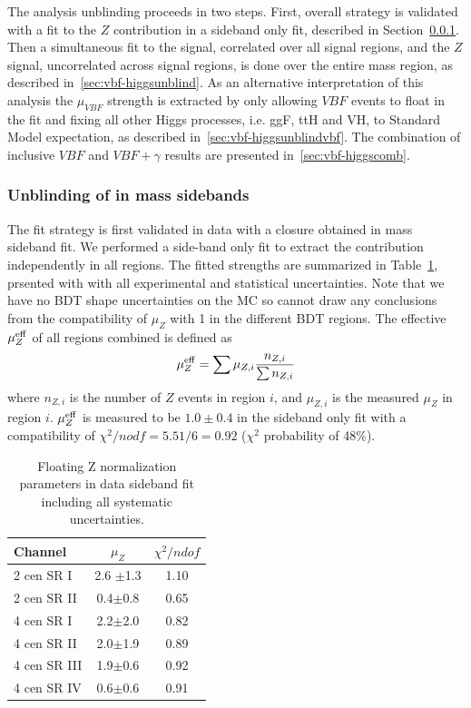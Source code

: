 The analysis unblinding proceeds in two steps.  First, overall strategy is validated with a fit to the $Z$ contribution in a sideband only fit, described in Section~\ref{sec:vbf-zunblind}.  Then a simultaneous fit to the signal, correlated over all signal regions, and the $Z$ signal, uncorrelated across signal regions, is done over the entire mass region, as described in~\ref{sec:vbf-higgsunblind}. As an alternative interpretation of this analysis the $\mu_{VBF}$ strength is extracted by only allowing $VBF$ events to float in the fit and fixing all other Higgs processes, i.e. ggF, ttH and VH, to Standard Model expectation, as described in~\ref{sec:vbf-higgsunblindvbf}. The combination of inclusive $VBF$ and $VBF+\gamma$ results are presented in~\ref{sec:vbf-higgscomb}.

\subsubsection{Unblinding of \zjets{} in mass sidebands}
\label{sec:vbf-zunblind}

The fit strategy is first validated in data with a closure obtained in \zjets{} mass sideband fit. We performed a side-band only fit to extract the \zjets{} contribution independently in all regions. The fitted \zjets{} strengths are summarized in Table~\ref{tab:zsidebandfit}, prsented with with all experimental and statistical uncertainties.   Note that we have no BDT shape uncertainties on the \zjets{} MC so cannot draw any conclusions from the compatibility of $\mu_Z$ with 1 in the different BDT regions. The effective $\mu_{Z}^{\rm eff}$ of all regions combined is defined as
\begin{equation}
\label{eqn:zsig}
\mu_{Z}^{\rm eff} = \sum \mu_{Z,i}\frac{n_{Z,i}}{\sum n_{Z,i}} 
\end{equation}
where $n_{Z,i}$ is the number of $Z$ events in region $i$, and $\mu_{Z,i}$ is the measured $\mu_Z$ in region $i$.  $\mu_{Z}^{\rm eff}$ is measured to be $1.0\pm 0.4$ in the sideband only fit with a compatibility of $\chi^2/nodf = 5.51/6=0.92$ ($\chi^2$ probability of 48\%).


\begin{table}[htbp]
\centering
\caption{Floating Z normalization parameters in data sideband fit including all systematic uncertainties.}
\label{tab:zsidebandfit}
\begin{tabular}{|l|c|c|}
\hline
Channel      & $\mu_{Z}$   & $\chi^2/ndof$ \\ \hline
2 cen SR I   & 2.6 $\pm$1.3  & 1.10          \\ \hline
2 cen SR II  & 0.4$\pm$0.8  & 0.65          \\ \hline
4 cen SR I   & 2.2$\pm$2.0  & 0.82          \\ \hline
4 cen SR II  & 2.0$\pm$1.9  & 0.89          \\ \hline
4 cen SR III & 1.9$\pm$0.6  & 0.92          \\ \hline
4 cen SR IV  & 0.6$\pm$0.6  & 0.91          \\ \hline
\end{tabular}
\end{table}



